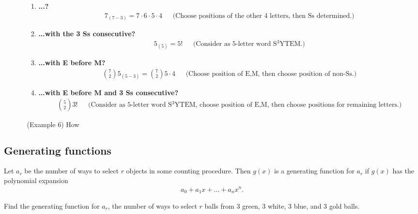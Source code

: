 \begin{enumerate}
\begin{enumerate}
\begin{enumerate}
    \item {\bf ...?}\\
      \begin{align*}
        7_{(7 - 3)} = 7\cdot 6\cdot 5\cdot 4 ~~~~~~~\text{(Choose positions of the other 4 letters, then Ss determined.)}
      \end{align*}
    \item {\bf ...with the 3 Ss consecutive?}
      \begin{align*}
        5_{(5)} = 5! ~~~~~~~\text{(Consider as 5-letter word S$^3$YTEM.)}
      \end{align*}
    \item {\bf ...with E before M?}
      \begin{align*}
        {7 \choose 2}5_{(5 - 3)} = {7 \choose 2}5\cdot 4 ~~~~~~~\text{(Choose position of E,M, then choose position of non-Ss.)}
      \end{align*}
    \item {\bf ...with E before M and 3 Ss consecutive?}
      \begin{align*}
        {5 \choose 2} 3! ~~~~~~~\text{(Consider as 5-letter word S$^3$YTEM, choose position of E,M, then choose positions for remaining letters.)}
      \end{align*}
    \end{enumerate}
  \item[(Example 6)] How
  \end{enumerate}
\end{enumerate}


\subsection{Generating functions}

\begin{definition*}
  Let $a_r$ be the number of ways to select $r$ objects in some counting procedure. Then $g(x)$ is
  a generating function for $a_r$ if $g(x)$ has the polynomial expansion
  \begin{align*}
    a_0 + a_1x + \ldots + a_nx^n.
  \end{align*}
\end{definition*}


\begin{example*}
  Find the generating function for $a_r$, the number of ways to select $r$ balls from $3$ green,
  $3$ white, $3$ blue, and $3$ gold balls.


\end{example*}


